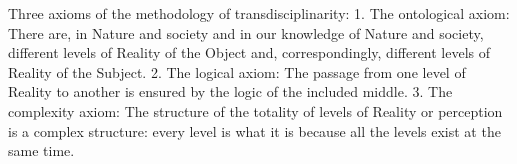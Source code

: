 %
Three axioms of the methodology of transdisciplinarity:
1. The ontological axiom: There are, in Nature and society and in our knowledge of Nature and society, different levels of Reality of the Object and, correspondingly, different levels of Reality of the Subject.
2. The logical axiom: The passage from one level of Reality to another is ensured by the logic of the included middle.
3. The complexity axiom: The structure of the totality of levels of Reality or perception is a complex structure: every level is what it is because all the levels exist at the same time. \autocite{Nicolescu2010}
%
%
%
%
